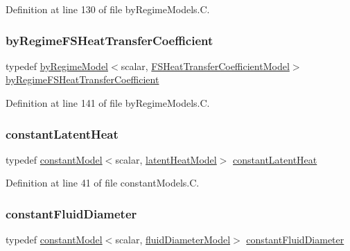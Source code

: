 Definition at line 130 of file by\+Regime\+Models.\+C.

\mbox{\label{namespaceFoam_a58cd69873671ef15ae6cdbab25c15f74}} 
\subsubsection{\texorpdfstring{by\+Regime\+F\+S\+Heat\+Transfer\+Coefficient}{byRegimeFSHeatTransferCoefficient}}
{\footnotesize\ttfamily typedef \hyperlink{classFoam_1_1byRegimeModel}{by\+Regime\+Model}$<$scalar, \hyperlink{classFoam_1_1FSHeatTransferCoefficientModel}{F\+S\+Heat\+Transfer\+Coefficient\+Model}$>$ \hyperlink{namespaceFoam_a58cd69873671ef15ae6cdbab25c15f74}{by\+Regime\+F\+S\+Heat\+Transfer\+Coefficient}}



Definition at line 141 of file by\+Regime\+Models.\+C.

\mbox{\label{namespaceFoam_af68e9abc0c6b136c3e34c66d816fb3a1}} 
\subsubsection{\texorpdfstring{constant\+Latent\+Heat}{constantLatentHeat}}
{\footnotesize\ttfamily typedef \hyperlink{classFoam_1_1constantModel}{constant\+Model}$<$scalar, \hyperlink{classFoam_1_1latentHeatModel}{latent\+Heat\+Model}$>$ \hyperlink{namespaceFoam_af68e9abc0c6b136c3e34c66d816fb3a1}{constant\+Latent\+Heat}}



Definition at line 41 of file constant\+Models.\+C.

\mbox{\label{namespaceFoam_a9b1f75fec8c575083695f6c9e80234cf}} 
\subsubsection{\texorpdfstring{constant\+Fluid\+Diameter}{constantFluidDiameter}}
{\footnotesize\ttfamily typedef \hyperlink{classFoam_1_1constantModel}{constant\+Model}$<$scalar, \hyperlink{classFoam_1_1fluidDiameterModel}{fluid\+Diameter\+Model}$>$ \hyperlink{namespaceFoam_a9b1f75fec8c575083695f6c9e80234cf}{constant\+Fluid\+Diameter}}




